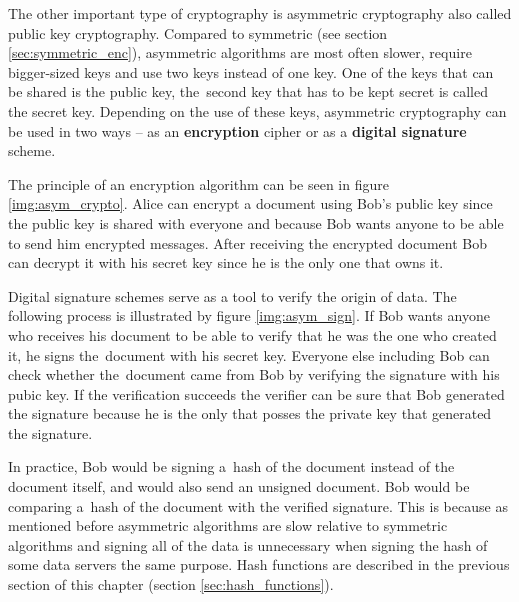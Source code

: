 The other important type of cryptography is asymmetric cryptography also called public key cryptography. Compared to symmetric (see section \ref{sec:symmetric_enc}), asymmetric algorithms are most often slower, require bigger-sized keys and use two keys instead of one key. One of the keys that can be shared is the public key, the~second key that has to be kept secret is called the secret key. Depending on the use of these keys, asymmetric cryptography can be used in two ways -- as an \textbf{encryption} cipher or as a \textbf{digital signature} scheme.

The principle of an encryption algorithm can be seen in figure \ref{img:asym_crypto}. Alice can encrypt a document using Bob's public key since the public key is shared with everyone and because Bob wants anyone to be able to send him encrypted messages. After receiving the encrypted document Bob can decrypt it with his secret key since he is the only one that owns it. \cite{Smart2004}


Digital signature schemes serve as a tool to verify the origin of data. The following process is illustrated by figure \ref{img:asym_sign}. If Bob wants anyone who receives his document to be able to verify that he was the one who created it, he signs the~document with his secret key. Everyone else including Bob can check whether the~document came from Bob by verifying the signature with his pubic key. If the verification succeeds the verifier can be sure that Bob generated the signature because he is the only that posses the private key that generated the signature. \cite{Paar2010}

In practice, Bob would be signing a~hash of the document instead of the document itself, and would also send an unsigned document. Bob would be comparing a~hash of the document with the verified signature. This is because as mentioned before asymmetric algorithms are slow relative to symmetric algorithms and signing all of the data is unnecessary when signing the hash of some data servers the same purpose. Hash functions are described in the previous section of this chapter (section \ref{sec:hash_functions}).

